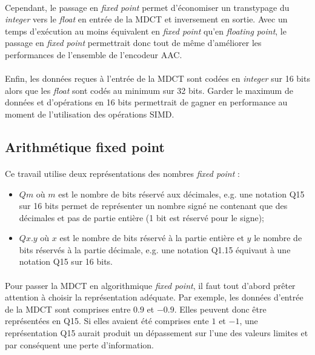 \documentclass{article}
\begin{document}
    \paragraph{}
    Cependant, le passage en \emph{fixed point} permet d'économiser un transtypage du \emph{integer} vers le \emph{float} en entrée de la MDCT et inversement en sortie. Avec un temps d'exécution au moins équivalent en \emph{fixed point} qu'en \emph{floating point}, le passage en \emph{fixed point} permettrait donc tout de même d'améliorer les performances de l'ensemble de l'encodeur AAC.

    \paragraph{}
    Enfin, les données reçues à l'entrée de la MDCT sont codées en \emph{integer} sur 16 bits alors que les \emph{float} sont codés au minimum sur 32 bits. Garder le maximum de données et d'opérations en 16 bits permettrait de gagner en performance au moment de l'utilisation des opérations SIMD.

    \subsection{Arithmétique fixed point}
    
    \paragraph{}
    Ce travail utilise deux représentations des nombres \emph{fixed point}\cite{2007-Oberstar} :
    \begin{itemize}
        \item $Qm$ où $m$ est le nombre de bits réservé aux décimales, e.g. une notation Q15 sur 16 bits permet de représenter un nombre signé ne contenant que des décimales et pas de partie entière (1 bit est réservé pour le signe);
        \item $Qx.y$ où $x$ est le nombre de bits réservé à la partie entière et $y$ le nombre de bits réservés à la partie décimale, e.g. une notation Q1.15 équivaut à une notation Q15 sur 16 bits.
    \end{itemize}

    \paragraph{}
    Pour passer la MDCT en algorithmique \emph{fixed point}, il faut tout d'abord prêter attention à choisir la représentation adéquate. Par exemple, les données d'entrée de la MDCT sont comprises entre $0.9$ et $-0.9$. Elles peuvent donc être représentées en Q15. Si elles avaient été comprises ente $1$ et $-1$, une représentation Q15 aurait produit un dépassement sur l'une des valeurs limites et par conséquent une perte d'information.
\end{document}
